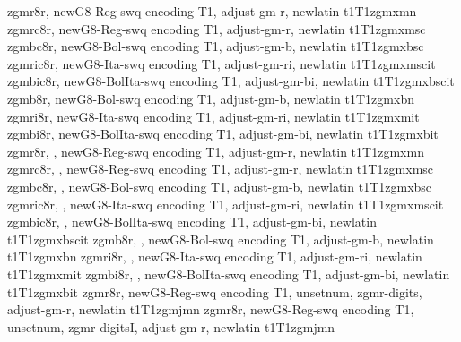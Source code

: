 
\installfonts

%
{zgmr8r,%
newG8-Reg-swq encoding T1,%
adjust-gm-r,%
newlatin}
{t1}{T1}{zgmx}{m}{n}{}
%
{zgmrc8r,%
newG8-Reg-swq encoding T1,%
adjust-gm-r,%
newlatin}
{t1}{T1}{zgmx}{m}{sc}{}
%
{zgmbc8r,%
newG8-Bol-swq encoding T1,%
adjust-gm-b,%
newlatin}
{t1}{T1}{zgmx}{b}{sc}{}
%
{zgmric8r,%
newG8-Ita-swq encoding T1,%
adjust-gm-ri,%
newlatin}
{t1}{T1}{zgmx}{m}{scit}{}
%
{zgmbic8r,%
newG8-BolIta-swq encoding T1,%
adjust-gm-bi,%
newlatin}
{t1}{T1}{zgmx}{b}{scit}{}
%
{zgmb8r,%
newG8-Bol-swq encoding T1,%
adjust-gm-b,%
newlatin}
{t1}{T1}{zgmx}{b}{n}{}
%
{zgmri8r,%
newG8-Ita-swq encoding T1,%
adjust-gm-ri,%
newlatin}
{t1}{T1}{zgmx}{m}{it}{}
%
{zgmbi8r,%
newG8-BolIta-swq encoding T1,%
adjust-gm-bi,%
newlatin}
{t1}{T1}{zgmx}{b}{it}{}
%
{zgmr8r,%
\metrics {},%
newG8-Reg-swq encoding T1,%
adjust-gm-r,%
newlatin}
{t1}{T1}{zgmx}{m}{n}{}
%
{zgmrc8r,%
\metrics {},%
newG8-Reg-swq encoding T1,%
adjust-gm-r,%
newlatin}
{t1}{T1}{zgmx}{m}{sc}{}
%
{zgmbc8r,%
\metrics {},%
newG8-Bol-swq encoding T1,%
adjust-gm-b,%
newlatin}
{t1}{T1}{zgmx}{b}{sc}{}
%
{zgmric8r,%
\metrics {},%
newG8-Ita-swq encoding T1,%
adjust-gm-ri,%
newlatin}
{t1}{T1}{zgmx}{m}{scit}{}
%
{zgmbic8r,%
\metrics {},%
newG8-BolIta-swq encoding T1,%
adjust-gm-bi,%
newlatin}
{t1}{T1}{zgmx}{b}{scit}{}
%
{zgmb8r,%
\metrics {},%
newG8-Bol-swq encoding T1,%
adjust-gm-b,%
newlatin}
{t1}{T1}{zgmx}{b}{n}{}
%
{zgmri8r,%
\metrics {},%
newG8-Ita-swq encoding T1,%
adjust-gm-ri,%
newlatin}
{t1}{T1}{zgmx}{m}{it}{}
%
{zgmbi8r,%
\metrics {},%
newG8-BolIta-swq encoding T1,%
adjust-gm-bi,%
newlatin}
{t1}{T1}{zgmx}{b}{it}{}
%
{zgmr8r,%
newG8-Reg-swq encoding T1,%
unsetnum,%
zgmr-digits,%
adjust-gm-r,%
newlatin}
{t1}{T1}{zgmj}{m}{n}{}
%
{zgmr8r,%
newG8-Reg-swq encoding T1,%
unsetnum,%
zgmr-digitsI,%
adjust-gm-r,%
newlatin}
{t1}{T1}{zgmj}{m}{n}{}
